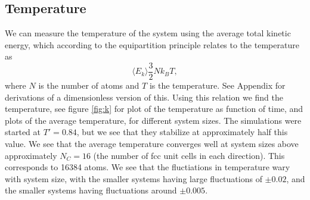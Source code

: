 \subsection*{Temperature}
We can measure the temperature of the system using the average total kinetic energy, which according to the equipartition principle relates to the temperature as
\[
    \langle E_k \rangle \frac{3}{2}Nk_BT,
\]
where $N$ is the number of atoms and $T$ is the temperature. See Appendix for derivations of a dimensionless version of this. Using this relation we find the temperature, see figure \ref{fig:k} for plot of the temperature as function of time, and plots of the average temperature, for different system sizes. The simulations were started at $T' = 0.84$, but we see that they stabilize at approximately half this value. We see that the average temperature converges well at system sizes above approximately $N_C = 16$ (the number of fcc unit cells in each direction). This corresponds to 16384 atoms. We see that the fluctiations in temperature wary with system size, with the smaller systems having large fluctuations of $\pm 0.02$, and the smaller systems having fluctuations around $\pm 0.005$.
